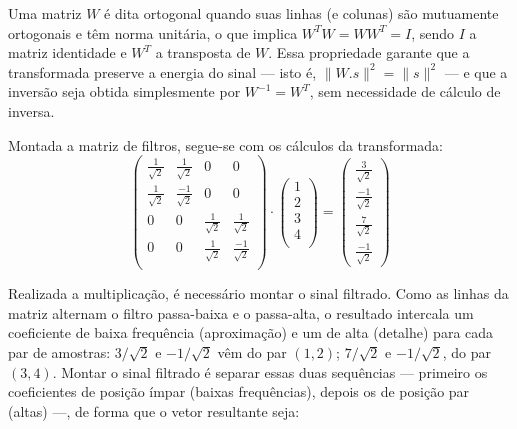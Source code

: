 			\par Uma matriz $W$ é dita ortogonal quando suas linhas (e colunas) são mutuamente ortogonais e têm norma unitária, o que implica $W^T W = W W^T = I$, sendo $I$ a matriz identidade e $W^T$ a transposta de $W$. Essa propriedade garante que a transformada preserve a energia do sinal --- isto é, $\|W.s\|^2 = \|s\|^2$ --- e que a inversão seja obtida simplesmente por $W^{-1} = W^T$, sem necessidade de cálculo de inversa.

			\par Montada a matriz de filtros, segue-se com os cálculos da transformada:
			\begin{equation}
				\begin{pmatrix}
					\frac{1}{\sqrt{2}} & \frac{1}{\sqrt{2}} & 0 & 0\\
					\frac{1}{\sqrt{2}} & \frac{-1}{\sqrt{2}} & 0 & 0\\
					0 & 0 & \frac{1}{\sqrt{2}} & \frac{1}{\sqrt{2}}\\
					0 & 0 & \frac{1}{\sqrt{2}} & \frac{-1}{\sqrt{2}}\\
				\end{pmatrix}
				\cdot
				\begin{pmatrix}
					1\\
					2\\
					3\\
					4\\
				\end{pmatrix}
				=
				\begin{pmatrix}
					\frac{3}{\sqrt{2}}\\
					\frac{-1}{\sqrt{2}}\\
					\frac{7}{\sqrt{2}}\\
					\frac{-1}{\sqrt{2}}
				\end{pmatrix}
				\label{eq:haarMultiplic}
			\end{equation}

			\par Realizada a multiplicação, é necessário montar o sinal filtrado. Como as linhas da matriz alternam o filtro passa-baixa e o passa-alta, o resultado intercala um coeficiente de baixa frequência (aproximação) e um de alta (detalhe) para cada par de amostras: $3/\sqrt{2}$ e $-1/\sqrt{2}$ vêm do par $(1,2)$; $7/\sqrt{2}$ e $-1/\sqrt{2}$, do par $(3,4)$. Montar o sinal filtrado é separar essas duas sequências --- primeiro os coeficientes de posição ímpar (baixas frequências), depois os de posição par (altas) ---, de forma que o vetor resultante seja:
			
